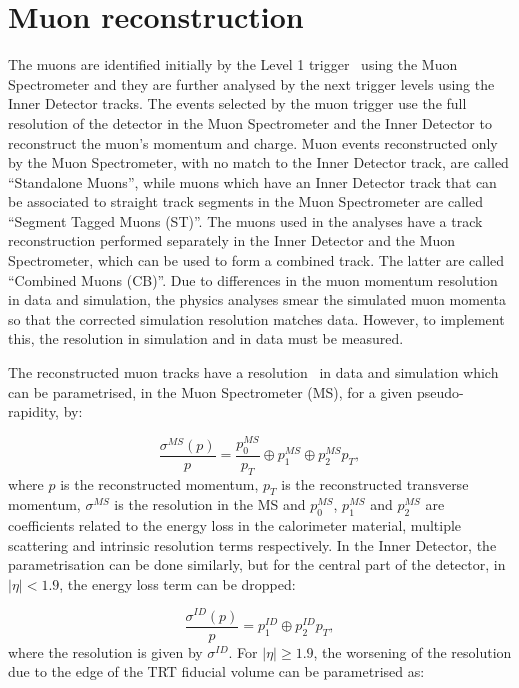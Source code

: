\section{Muon reconstruction}
\label{sec:atlas_muon}

The muons are identified initially by the Level 1 trigger~\cite{muonperf2010}
using the Muon Spectrometer and they are further analysed by the next trigger levels using the Inner Detector tracks.
The events selected by the muon trigger use the full resolution of the detector in the Muon Spectrometer and the Inner Detector to reconstruct the muon's momentum and charge.
Muon events reconstructed only by the Muon Spectrometer, with no match to the Inner Detector track, are called ``Standalone Muons'', while muons which have an Inner Detector
track that can be associated to straight track segments in the Muon Spectrometer are called ``Segment Tagged Muons (ST)''.
The muons used in the analyses have a track reconstruction
performed separately in the Inner Detector and the Muon Spectrometer, which can be used to form a combined track. The latter are called ``Combined Muons (CB)''.
Due to differences in the muon momentum resolution in data and simulation, the physics analyses smear the simulated
muon momenta so that the corrected simulation resolution matches
data. However, to implement this, the resolution in simulation and in data must be measured.

The reconstructed muon tracks have a resolution~\cite{muonres2010} in data and simulation which can be parametrised, in the Muon Spectrometer (MS),
for a given pseudo-rapidity, by:

\begin{equation}
\displaystyle
\frac{\sigma^{MS}(p)}{p} = \frac{p_0^{MS}}{p_T} \oplus p_1^{MS} \oplus p_2^{MS} p_T,
\label{eq:muon_res_ms}
\end{equation}
where $p$ is the reconstructed momentum, $p_T$ is the reconstructed transverse momentum, $\sigma^{MS}$ is the resolution in the MS
and $p_0^{MS}$, $p_1^{MS}$ and $p_2^{MS}$ are coefficients related to the energy loss in the calorimeter material, multiple scattering and intrinsic resolution terms
respectively.
In the Inner Detector, the parametrisation can be done similarly, but for the central part of the detector, in $|\eta| < 1.9$, the energy loss term can be dropped:

\begin{equation}
\displaystyle
\frac{\sigma^{ID}(p)}{p} = p_1^{ID} \oplus p_2^{ID} p_T,
\label{eq:muon_res_id_central}
\end{equation}
where the resolution is given by $\sigma^{ID}$. For $|\eta| \geq 1.9$, the worsening of the resolution due to the edge of the TRT fiducial volume can be parametrised as:

